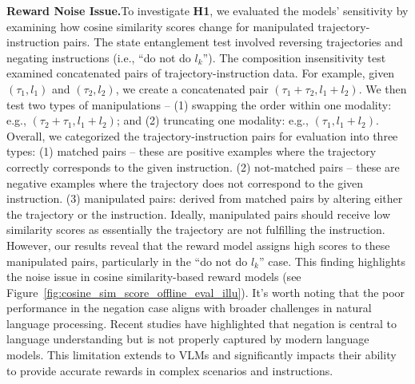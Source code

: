 \documentclass{article}
\theoremstyle{plain}
\theoremstyle{definition}
\theoremstyle{remark}
\begin{document}
\noindent\textbf{Reward Noise Issue.}\quad To investigate \textbf{H1}, we evaluated the models' sensitivity by examining how cosine similarity scores change for manipulated trajectory-instruction pairs. The state entanglement test involved reversing trajectories and negating instructions (i.e., ``do not do $l_k$''). The composition insensitivity test examined concatenated pairs of trajectory-instruction data. For example, given $(\tau_1, l_1)$ and $(\tau_2, l_2)$, we create a concatenated pair $(\tau_1 + \tau_2, l_1 + l_2)$. We then test two types of manipulations -- (1) swapping the order within one modality: e.g., $(\tau_2+ \tau_1, l_1 + l_2)$; and (2) truncating one modality: e.g., $(\tau_1, l_1 + l_2)$. Overall, we categorized the trajectory-instruction pairs for evaluation into three types: (1) matched pairs -- these are positive examples where the trajectory correctly corresponds to the given instruction. (2) not-matched pairs -- these are negative examples where the trajectory does not correspond to the given instruction. (3) manipulated pairs: derived from matched pairs by altering either the trajectory or the instruction. Ideally, manipulated pairs should receive low similarity scores as essentially the trajectory are not fulfilling the instruction. However, our results reveal that the reward model assigns high scores to these manipulated pairs, particularly in the ``do not do $l_k$'' case. This finding highlights the noise issue in cosine similarity-based reward models (see Figure~\ref{fig:cosine_sim_score_offline_eval_illu}). It's worth noting that the poor performance in the negation case aligns with broader challenges in natural language processing. Recent studies \citep{hossain2022analysis, truong2023language} have highlighted that negation is central to language understanding but is not properly captured by modern language models. This limitation extends to VLMs and significantly impacts their ability to provide accurate rewards in complex scenarios and instructions.
\end{document}

